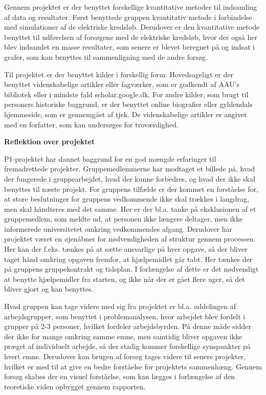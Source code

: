 Gennem projektet er der benyttet forskellige kvantitative metoder til indsamling af data og resultater. Først benyttede gruppen kvantitativ metode i forbindelse med simulationer af de elektriske kredsløb. Derudover er den kvantitative metode benyttet til udførelsen af forsøgene med de elektriske kredsløb, hvor der også her blev indsamlet en masse resultater, som senere er blevet beregnet på og indsat i grafer, som kan benyttes til sammenligning med de andre forsøg.

Til projektet er der benyttet kilder i forskellig form. Hovedsageligt er der benyttet videnskabelige artikler eller fagværker, som er godkendt af AAU's bibliotek eller i mindste fald scholar.google.dk. For andre kilder, som brugt til personers historiske baggrund, er der benyttet online biografier eller gyldendals hjemmeside, som er gennemgået af tjek. De videnskabelige artikler er angivet med en forfatter, som kan undersøges for troværdighed.

\newpage

\textbf{Reflektion over projektet}

P1-projektet har dannet baggrund for en god mængde erfaringer til fremadrettede projekter. Gruppemedlemmerne har modtaget et billede på, hvad der fungerede i gruppearbejdet, hvad der kunne forbedres, og hvad der ikke skal benyttes til næste projekt. For gruppens tilfælde er der kommet en forståelse for, at store beslutninger for gruppens vedkommende ikke skal trækkes i langdrag, men skal håndteres med det samme. Her er der bl.a. tanke på eksklusionen af et gruppemedlem, som meldte ud, at personen ikke længere deltager, men ikke informerede universitetet omkring vedkommendes afgang. Derudover har projektet været en øjenåbner for nødvendigheden af struktur gennem processen. Her kan der f.eks. tænkes på at sætte ansvarlige på hver opgave, så der bliver taget hånd omkring opgaven fremfor, at hjælpemidlet går tabt. Her tænkes der på gruppens gruppekontrakt og tidsplan. I forlængelse af dette er det nødvendigt at benytte hjælpemidler fra starten, og ikke når der er gået flere uger, så det bliver gjort og kan benyttes.

Hvad gruppen kan tage videre med sig fra projektet er bl.a. uddelingen af arbejdsgrupper, som benyttet i problemanalysen, hvor arbejdet blev fordelt i grupper på 2-3 personer, hvilket fordeler arbejdsbyrden. På denne måde sidder der ikke for mange omkring samme emne, men samtidig bliver opgaven ikke præget af individuelt arbejde, så der stadig kommer forskellige synspunkter på hvert emne. Derudover kan brugen af forsøg tages videre til senere projekter, hvilket er med til at give en bedre forståelse for projektets sammenhæng. Gennem forsøg skabes der en visuel forståelse, som kan lægges i forlængelse af den teoretiske viden opbygget gennem rapporten.

